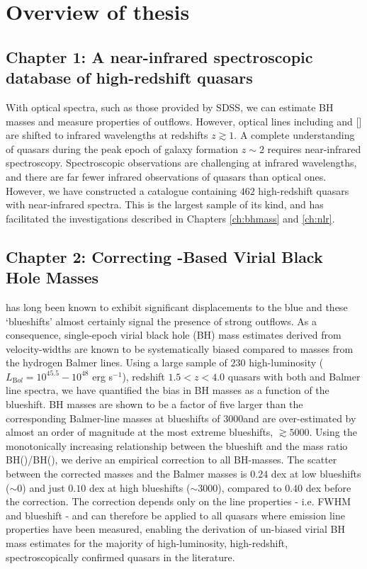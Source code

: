 \section{Overview of thesis}

\subsection{Chapter 1: A near-infrared spectroscopic database of high-redshift quasars}

With optical spectra, such as those provided by SDSS, we can estimate BH masses and measure properties of outflows. 
However, optical lines including \hb and [] are shifted to infrared wavelengths at redshifts $z\gtrsim1$. 
A complete understanding of quasars during the peak epoch of galaxy formation $z\sim2$ requires near-infrared spectroscopy. 
Spectroscopic observations are challenging at infrared wavelengths, and there are far fewer infrared observations of quasars than optical ones. 
However, we have constructed a catalogue containing $462$ high-redshift quasars with near-infrared spectra. 
This is the largest sample of its kind, and has facilitated the investigations described in Chapters \ref{ch:bhmass} and \ref{ch:nlr}.   

\subsection{Chapter 2: Correcting -Based Virial Black Hole Masses}

 has long been known to exhibit significant displacements to the blue and these `blueshifts' almost certainly signal the presence of strong outflows.
As a consequence, single-epoch virial black hole (BH) mass estimates derived from  velocity-widths are known to be systematically biased compared to masses from the hydrogen Balmer lines. 
Using a large sample of $230$ high-luminosity ($L_{\mathrm Bol} = 10^{45.5}-10^{48}$ erg s$^{-1}$), redshift $1.5 < z < 4.0$ quasars with both  and Balmer line spectra, we have quantified the bias in  BH masses as a function of the  blueshift. 
 BH masses are shown to be a factor of five larger than the corresponding Balmer-line masses at  blueshifts of $3000$\kms and are over-estimated by almost an order of magnitude at the most extreme blueshifts, $\gtrsim 5000$\kms.
Using the monotonically increasing relationship between the  blueshift and the mass ratio BH()/BH(\hans), we derive an empirical correction to all  BH-masses.
The scatter between the corrected  masses and the Balmer masses is $0.24$ dex at low  blueshifts ($\sim0$\kms) and just $0.10$ dex at high blueshifts ($\sim3000$\kms), compared to $0.40$ dex before the correction. 
The correction depends only on the  line properties - i.e.  FWHM  and blueshift - and can therefore be applied to all quasars where  emission line properties have been measured, enabling the derivation of un-biased virial BH mass estimates for the majority of high-luminosity, high-redshift, spectroscopically confirmed quasars in the literature.

